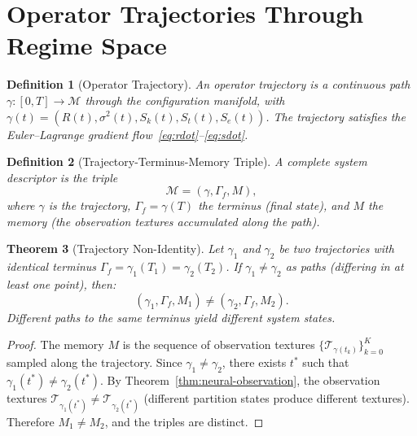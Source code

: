 \documentclass[11pt,twocolumn,a4paper]{article}
\newtheorem{theorem}{Theorem}[section]
\newtheorem{definition}[theorem]{Definition}
\newcommand{\Sk}{S_k}
\newcommand{\St}{S_t}
\newcommand{\Se}{S_e}
\newcommand{\Tex}{\mathcal{T}}
\begin{document}

\section{Operator Trajectories Through Regime Space}
\label{sec:trajectories}

\begin{definition}[Operator Trajectory]
\label{def:trajectory}
An operator trajectory is a continuous path $\gamma : [0, T] \to \mathcal{M}$ through the configuration manifold, with $\gamma(t) = (R(t), \sigma^2(t), \Sk(t), \St(t), \Se(t))$.
The trajectory satisfies the Euler--Lagrange gradient flow~\eqref{eq:rdot}--\eqref{eq:sdot}.
\end{definition}

\begin{definition}[Trajectory-Terminus-Memory Triple]
\label{def:ttm}
A complete system descriptor is the triple~\cite{sachikonye2026operator}
\begin{equation}
\mathcal{M} = (\gamma, \Gamma_f, M),
\label{eq:ttm}
\end{equation}
where $\gamma$ is the trajectory, $\Gamma_f = \gamma(T)$ the terminus (final state), and $M$ the memory (the observation textures accumulated along the path).
\end{definition}

\begin{theorem}[Trajectory Non-Identity]
\label{thm:nonidentity}
Let $\gamma_1$ and $\gamma_2$ be two trajectories with identical terminus $\Gamma_f = \gamma_1(T_1) = \gamma_2(T_2)$.
If $\gamma_1 \neq \gamma_2$ as paths (differing in at least one point), then:
\begin{equation}
(\gamma_1, \Gamma_f, M_1) \neq (\gamma_2, \Gamma_f, M_2).
\label{eq:nonidentity}
\end{equation}
Different paths to the same terminus yield different system states.
\end{theorem}

\begin{proof}
The memory $M$ is the sequence of observation textures $\{\Tex_{\gamma(t_k)}\}_{k=0}^{K}$ sampled along the trajectory.
Since $\gamma_1 \neq \gamma_2$, there exists $t^*$ such that $\gamma_1(t^*) \neq \gamma_2(t^*)$.
By Theorem~\ref{thm:neural-observation}, the observation textures $\Tex_{\gamma_1(t^*)} \neq \Tex_{\gamma_2(t^*)}$ (different partition states produce different textures).
Therefore $M_1 \neq M_2$, and the triples are distinct.
\end{proof}
\end{document}
